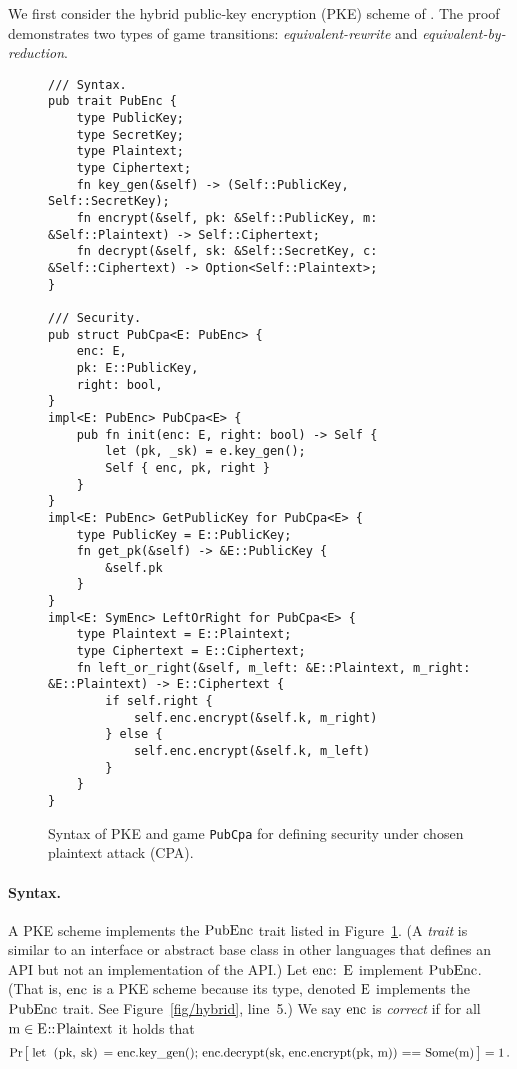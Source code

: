 \documentclass{article}
\newcommand{\Prob}[1]{\Pr\hspace{-1pt}\big[\,#1\,\big]}
\newcommand{\code}[1]{\textrm{\textup{\lstinline{#1}}}}
\begin{document}
We first consider the hybrid public-key encryption (PKE) scheme of
\cite[Chapter~15]{joy}.
%
The proof demonstrates two types of game transitions: \emph{equivalent-rewrite}
and \emph{equivalent-by-reduction}.


\begin{figure}[t]
\begin{lstlisting}
/// Syntax.
pub trait PubEnc {
    type PublicKey;
    type SecretKey;
    type Plaintext;
    type Ciphertext;
    fn key_gen(&self) -> (Self::PublicKey, Self::SecretKey);
    fn encrypt(&self, pk: &Self::PublicKey, m: &Self::Plaintext) -> Self::Ciphertext;
    fn decrypt(&self, sk: &Self::SecretKey, c: &Self::Ciphertext) -> Option<Self::Plaintext>;
}

/// Security.
pub struct PubCpa<E: PubEnc> {
    enc: E,
    pk: E::PublicKey,
    right: bool,
}
impl<E: PubEnc> PubCpa<E> {
    pub fn init(enc: E, right: bool) -> Self {
        let (pk, _sk) = e.key_gen();
        Self { enc, pk, right }
    }
}
impl<E: PubEnc> GetPublicKey for PubCpa<E> {
    type PublicKey = E::PublicKey;
    fn get_pk(&self) -> &E::PublicKey {
        &self.pk
    }
}
impl<E: SymEnc> LeftOrRight for PubCpa<E> {
    type Plaintext = E::Plaintext;
    type Ciphertext = E::Ciphertext;
    fn left_or_right(&self, m_left: &E::Plaintext, m_right: &E::Plaintext) -> E::Ciphertext {
        if self.right {
            self.enc.encrypt(&self.k, m_right)
        } else {
            self.enc.encrypt(&self.k, m_left)
        }
    }
}
\end{lstlisting}
  \caption{Syntax of PKE and game \lstinline{PubCpa}
  for defining security under chosen plaintext attack (CPA).}
  \label{fig/pubenc/security}
  \label{fig/pubenc/syntax}
\end{figure}


\paragraph{Syntax.}
%
A PKE scheme implements the $\code{PubEnc}$ trait listed in
Figure~\ref{fig/pubenc/syntax}.
%
(A \emph{trait} is similar to an interface or abstract base class in other
languages that defines an API but not an implementation of the API.)
%
Let $\code{enc: E}$ implement $\code{PubEnc}$.
%
(That is, $\code{enc}$ is a PKE scheme because its type, denoted $\code{E}$
implements the $\code{PubEnc}$ trait. See Figure~\ref{fig/hybrid}, line~5.)
%
We say $\code{enc}$ is \emph{correct} if for all $\code{m} \in
\code{E::Plaintext}$ it holds that
%
\[
  \Prob{
    \code{let (pk, sk) = enc.key_gen();
    enc.decrypt(sk, enc.encrypt(pk, m)) == Some(m)}
  } = 1 \,.
\]
\end{document}
